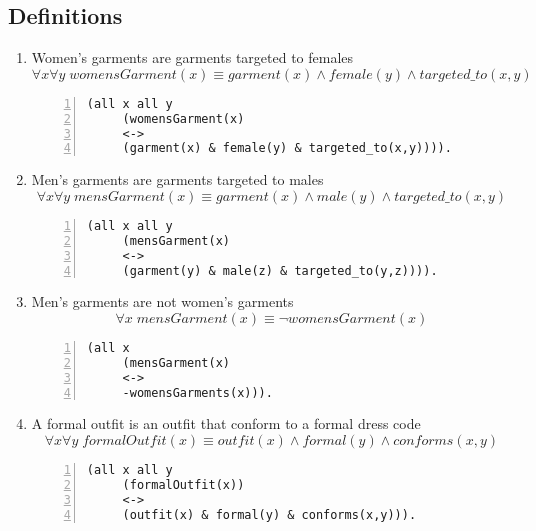\documentclass[paper=a4, fontsize=11pt]{scrartcl} %
\numberwithin{equation}{section} %
\numberwithin{figure}{section} %
\numberwithin{table}{section} %
\begin{document}
\subsection{Definitions}
\begin{enumerate}

	\item Women's garments are garments targeted to females
	\begin{equation*}
		\forall x \forall y \; womensGarment(x) \equiv garment(x) \land female(y) \land targeted\_to(x,y)
	\end{equation*}
	\begin{Verbatim}[frame=lines,gobble=2,numbers=left]
	 (all x all y 
	 (womensGarment(x) 
	 <-> 
	 (garment(x) & female(y) & targeted_to(x,y)))).
	\end{Verbatim}


	\item Men's garments are garments targeted to males
	\begin{equation*}
		\forall x \forall y \; mensGarment(x) \equiv garment(x) \land male(y) \land targeted\_to(x,y)
	\end{equation*}
	\begin{Verbatim}[frame=lines,gobble=2,numbers=left]
	 (all x all y
	 (mensGarment(x) 
	 <-> 
	 (garment(y) & male(z) & targeted_to(y,z)))). 
	\end{Verbatim}


	\item Men's garments are not women's garments
	\begin{equation*}
		\forall x \; mensGarment(x) \equiv \lnot womensGarment(x)
	\end{equation*}
	\begin{Verbatim}[frame=lines,gobble=2,numbers=left]
	 (all x 
	 (mensGarment(x) 
	 <->
	 -womensGarments(x))).
	\end{Verbatim}
	

	\item A formal outfit is an outfit that conform to a formal dress code
	\begin{equation*}
		\forall x \forall y \; formalOutfit(x) \equiv outfit(x) \land formal(y) \land conforms(x,y)
	\end{equation*}
	\begin{Verbatim}[frame=lines,gobble=2,numbers=left]
	 (all x all y 
	 (formalOutfit(x))
	 <->
	 (outfit(x) & formal(y) & conforms(x,y))).
	\end{Verbatim}


\end{enumerate}
\end{document}
